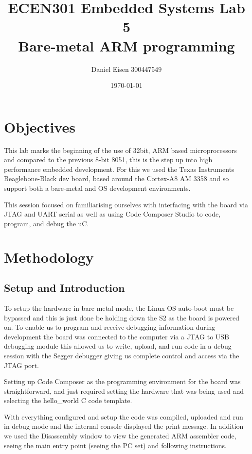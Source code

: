 \documentclass[11pt]{article}
\title{ECEN301 Embedded Systems Lab 5 \\ Bare-metal ARM programming}
\author{Daniel Eisen 300447549}
\date{\today}
\begin{document}
\begin{preview}
\maketitle
\section{Objectives}
This lab marks the beginning of the use of 32bit, ARM based microprocessors and compared to the previous 8-bit 8051, this is the step up into high performance embedded development. For this we used the Texas Instruments Beaglebone-Black dev board, based around the Cortex-A8 AM 3358 and so support both a bare-metal and OS development environments.

This session focused on familiarising ourselves with interfacing with the board via JTAG and UART serial as well as using Code Composer Studio to code, program, and debug the uC.

\section{Methodology}
    \subsection{Setup and Introduction}
    To setup the hardware in bare metal mode, the Linux OS auto-boot must be bypassed and this is just done be holding down the S2 as the board is powered on. To enable us to program and receive debugging information during development the board was connected to the computer via a JTAG to USB debugging module this allowed us to write, upload, and run code in a debug session with the Segger debugger giving us complete control and access via the JTAG port.     

    Setting up Code Composer as the programming environment for the board was straightforward, and just required setting the hardware that was being used and selecting the hello\_world C code template.
    
    With everything configured and setup the code was compiled, uploaded and run in debug mode and the internal console displayed the print message. In addition we used the Disassembly window to view the generated ARM assembler code, seeing the main entry point (seeing the PC set) and following instructions.


\end{preview}
\end{document}
